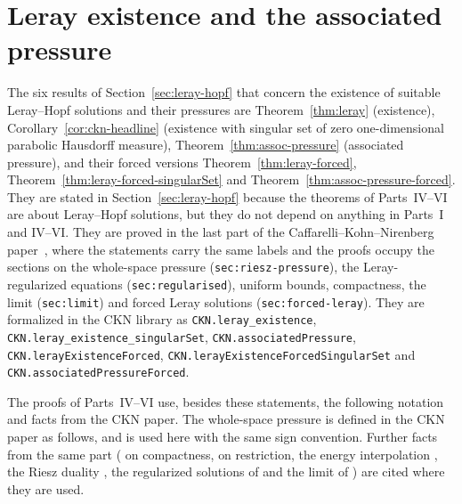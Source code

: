 \documentclass[11pt,letterpaper]{article}
\numberwithin{equation}{section}
\theoremstyle{plain}
\theoremstyle{definition}
\theoremstyle{remark}
\begin{document}
\section{Leray existence and the associated pressure}\label{sec:existence-in-ckn}

The six results of Section~\ref{sec:leray-hopf} that concern the existence of
suitable Leray--Hopf solutions and their pressures are Theorem~\ref{thm:leray}
(existence), Corollary~\ref{cor:ckn-headline} (existence with singular set of
zero one-dimensional parabolic Hausdorff measure), Theorem~\ref{thm:assoc-pressure}
(associated pressure), and their forced versions
Theorem~\ref{thm:leray-forced}, Theorem~\ref{thm:leray-forced-singularSet} and
Theorem~\ref{thm:assoc-pressure-forced}. They are stated in
Section~\ref{sec:leray-hopf} because the theorems of Parts~IV--VI are about
Leray--Hopf solutions, but they do not depend on anything in Parts~I and
IV--VI. They are proved in the last part of the Caffarelli--Kohn--Nirenberg
paper~\cite{CKNLean}, where the statements carry the same labels and the
proofs occupy the sections on the whole-space pressure
(\texttt{sec:riesz-pressure}), the Leray-regularized equations
(\texttt{sec:regularised}), uniform bounds, compactness, the limit
(\texttt{sec:limit}) and forced Leray solutions (\texttt{sec:forced-leray}).
They are formalized in the CKN library as \texttt{CKN.leray\_existence},
\texttt{CKN.leray\_existence\_singularSet}, \texttt{CKN.associatedPressure},
\texttt{CKN.lerayExistenceForced},
\texttt{CKN.lerayExistenceForcedSingularSet} and
\texttt{CKN.associatedPressureForced}.

The proofs of Parts~IV--VI use, besides these statements, the following
notation and facts from the CKN paper. The whole-space pressure is defined in
the CKN paper as follows, and is used here with the same sign convention.
Further facts from the same part (\cite[Lemma~11.1]{CKNLean} on
compactness, \cite[Lemma~11.5]{CKNLean} on restriction, the
energy interpolation \cite[Lemma~8.4]{CKNLean}, the
Riesz duality \cite[Lemma~8.2]{CKNLean}, the regularized solutions
of \cite[Theorem~9.4]{CKNLean} and the limit of
\cite[Proposition~12.1]{CKNLean}) are cited where they are used.
\end{document}
